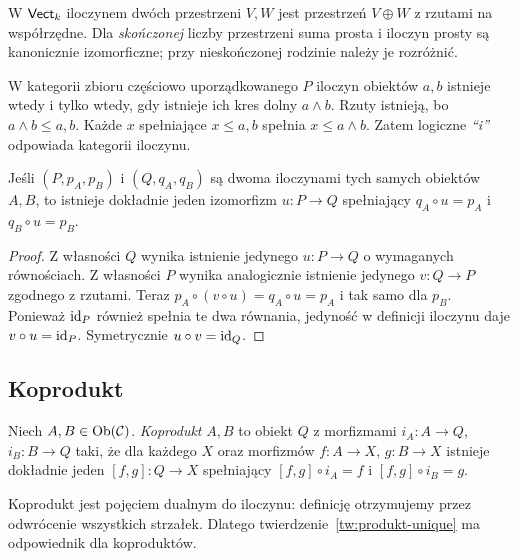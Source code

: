 \begin{przyklad}
W $\mathsf{Vect}_k$ iloczynem dwóch przestrzeni $V,W$ jest przestrzeń $V\oplus W$ z rzutami na współrzędne. Dla \emph{skończonej} liczby przestrzeni suma prosta i iloczyn prosty są kanonicznie izomorficzne; przy nieskończonej rodzinie należy je rozróżnić.
\end{przyklad}

\begin{przyklad}
W kategorii zbioru częściowo uporządkowanego $P$ iloczyn obiektów $a,b$ istnieje wtedy i tylko wtedy, gdy istnieje ich kres dolny $a\wedge b$. Rzuty istnieją, bo $a\wedge b\leq a,b$. Każde $x$ spełniające $x\leq a,b$ spełnia $x\leq a\wedge b$. Zatem logiczne \emph{``i''} odpowiada kategorii iloczynu.
\end{przyklad}

\begin{twierdzenie}\label{tw:produkt-unique}
Jeśli $(P,p_A,p_B)$ i $(Q,q_A,q_B)$ są dwoma iloczynami tych samych obiektów $A,B$, to istnieje dokładnie jeden izomorfizm $u:P\to Q$ spełniający $q_A\circ u=p_A$ i $q_B\circ u=p_B$.
\end{twierdzenie}
\begin{proof}
Z własności $Q$ wynika istnienie jedynego $u:P\to Q$ o wymaganych równościach. Z własności $P$ wynika analogicznie istnienie jedynego $v:Q\to P$ zgodnego z rzutami. Teraz $p_A\circ(v\circ u)=q_A\circ u=p_A$ i tak samo dla $p_B$. Ponieważ $\mathrm{id}_P$ również spełnia te dwa równania, jedyność w definicji iloczynu daje $v\circ u=\mathrm{id}_P$. Symetrycznie $u\circ v=\mathrm{id}_Q$.
\end{proof}

\subsection{Koprodukt}

\begin{definicja}\label{def:koprodukt}
Niech $A,B\in\operatorname{Ob}(\mathcal C)$. \emph{Koprodukt} $A,B$ to obiekt $Q$ z morfizmami $i_A:A\to Q$, $i_B:B\to Q$ taki, że dla każdego $X$ oraz morfizmów $f:A\to X$, $g:B\to X$ istnieje dokładnie jeden $[f,g]:Q\to X$ spełniający $[f,g]\circ i_A=f$ i $[f,g]\circ i_B=g$.
\end{definicja}

Koprodukt jest pojęciem dualnym do iloczynu: definicję otrzymujemy przez odwrócenie wszystkich strzałek. Dlatego twierdzenie~\ref{tw:produkt-unique} ma odpowiednik dla koproduktów.

